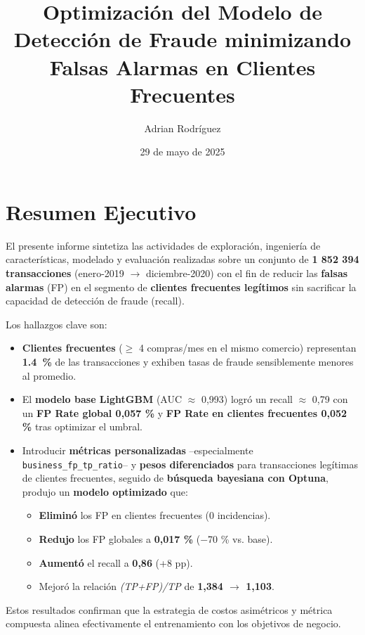 \documentclass[a4paper,12pt]{article}
\title{Optimización del Modelo de Detección de Fraude minimizando Falsas Alarmas en Clientes Frecuentes}
\author{Adrian Rodríguez}
\date{29 de mayo de 2025}
\begin{document}
\maketitle

\section{Resumen Ejecutivo}
El presente informe sintetiza las actividades de exploración, ingeniería de características, modelado y evaluación realizadas sobre un conjunto de \textbf{1 852 394 transacciones} (enero-2019 $\rightarrow$ diciembre-2020) con el fin de reducir las \textbf{falsas alarmas} (FP) en el segmento de \textbf{clientes frecuentes legítimos} sin sacrificar la capacidad de detección de fraude (recall).

Los hallazgos clave son:
\begin{itemize}
    \item \textbf{Clientes frecuentes} ($\geq$ 4 compras/mes en el mismo comercio) representan \textbf{\SI{1.4}{\percent}} de las transacciones y exhiben tasas de fraude sensiblemente menores al promedio.
    \item El \textbf{modelo base LightGBM} (AUC $\approx$ 0,993) logró un recall $\approx$ 0,79 con un \textbf{FP Rate global 0,057 \si{\percent}} y \textbf{FP Rate en clientes frecuentes 0,052 \si{\percent}} tras optimizar el umbral.
    \item Introducir \textbf{métricas personalizadas} –especialmente \texttt{business\_fp\_tp\_ratio}– y \textbf{pesos diferenciados} para transacciones legítimas de clientes frecuentes, seguido de \textbf{búsqueda bayesiana con Optuna}, produjo un \textbf{modelo optimizado} que:
    \begin{itemize}
        \item \textbf{Eliminó} los FP en clientes frecuentes (0 incidencias).
        \item \textbf{Redujo} los FP globales a \textbf{0,017 \si{\percent}} ($-$70 \si{\percent} vs. base).
        \item \textbf{Aumentó} el recall a \textbf{0,86} (+8 pp).
        \item Mejoró la relación \textit{(TP+FP)/TP} de \textbf{1,384 $\rightarrow$ 1,103}.
    \end{itemize}
\end{itemize}
Estos resultados confirman que la estrategia de costos asimétricos y métrica compuesta alinea efectivamente el entrenamiento con los objetivos de negocio.
\end{document}
